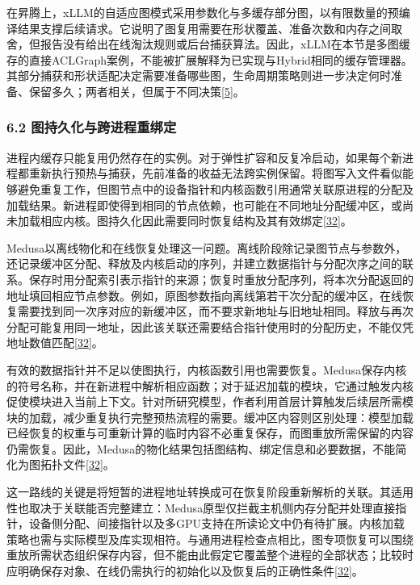 \documentclass[UTF8,11pt,fontset=windows]{ctexart}
\begin{document}
在昇腾上，xLLM的自适应图模式采用参数化与多缓存部分图，以有限数量的预编译结果支撑后续请求。它说明了图复用需要在形状覆盖、准备次数和内存之间取舍，但报告没有给出在线淘汰规则或后台捕获算法。因此，xLLM在本节是多图缓存的直接ACLGraph案例，不能被扩展解释为已实现与Hybrid相同的缓存管理器。其部分捕获和形状适配决定需要准备哪些图，生命周期策略则进一步决定何时准备、保留多久；两者相关，但属于不同决策\protect\hyperlink{ref-5}{{[}5{]}}。

\hypertarget{section-6-2}{%
\subsubsection{\texorpdfstring{\textbf{6.2 图持久化与跨进程重绑定}}{6.2 图持久化与跨进程重绑定}}\label{section-6-2}}

进程内缓存只能复用仍然存在的实例。对于弹性扩容和反复冷启动，如果每个新进程都重新执行预热与捕获，先前准备的收益无法跨实例保留。将图写入文件看似能够避免重复工作，但图节点中的设备指针和内核函数引用通常关联原进程的分配及加载结果。新进程即使得到相同的节点依赖，也可能在不同地址分配缓冲区，或尚未加载相应内核。图持久化因此需要同时恢复结构及其有效绑定\protect\hyperlink{ref-32}{{[}32{]}}。

Medusa以离线物化和在线恢复处理这一问题。离线阶段除记录图节点与参数外，还记录缓冲区分配、释放及内核启动的序列，并建立数据指针与分配次序之间的联系。保存时用分配索引表示指针的来源；恢复时重放分配序列，将本次分配返回的地址填回相应节点参数。例如，原图参数指向离线第若干次分配的缓冲区，在线恢复需要找到同一次序对应的新缓冲区，而不要求新地址与旧地址相同。释放与再次分配可能复用同一地址，因此该关联还需要结合指针使用时的分配历史，不能仅凭地址数值匹配\protect\hyperlink{ref-32}{{[}32{]}}。

有效的数据指针并不足以使图执行，内核函数引用也需要恢复。Medusa保存内核的符号名称，并在新进程中解析相应函数；对于延迟加载的模块，它通过触发内核促使模块进入当前上下文。针对所研究模型，作者利用首层计算触发后续层所需模块的加载，减少重复执行完整预热流程的需要。缓冲区内容则区别处理：模型加载已经恢复的权重与可重新计算的临时内容不必重复保存，而图重放所需保留的内容仍需恢复。因此，Medusa的物化结果包括图结构、绑定信息和必要数据，不能简化为图拓扑文件\protect\hyperlink{ref-32}{{[}32{]}}。

这一路线的关键是将短暂的进程地址转换成可在恢复阶段重新解析的关联。其适用性也取决于关联能否完整建立：Medusa原型仅拦截主机侧内存分配并处理直接指针，设备侧分配、间接指针以及多GPU支持在所读论文中仍有待扩展。内核加载策略也需与实际模型及库实现相符。与通用进程检查点相比，图专项恢复可以围绕重放所需状态组织保存内容，但不能由此假定它覆盖整个进程的全部状态；比较时应明确保存对象、在线仍需执行的初始化以及恢复后的正确性条件\protect\hyperlink{ref-32}{{[}32{]}}。
\end{document}
